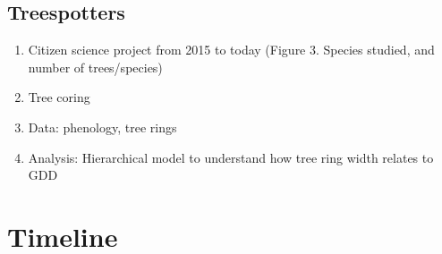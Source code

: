 \documentclass{article}
\begin{document}
\subsection {Treespotters}
\begin {enumerate}
	\item Citizen science project from 2015 to today (Figure 3. Species studied, and number of trees/species)
	\item Tree coring
	\item Data: phenology, tree rings
	\item Analysis: Hierarchical model to understand how tree ring width relates to GDD	
\end {enumerate}

\section*{Timeline}

\end{document}
